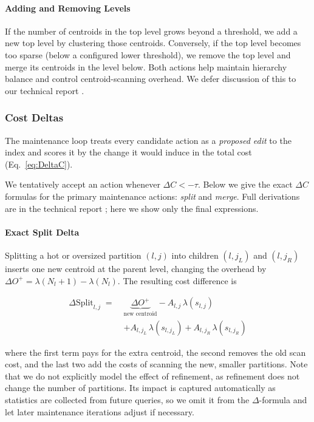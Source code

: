 \paragraph{Adding and Removing Levels} If the number of centroids in the top level grows beyond a threshold, we add a new top level by clustering those centroids. Conversely, if the top level becomes too sparse (below a configured lower threshold), we remove the top level and merge its centroids in the level below. Both actions help maintain hierarchy balance and control centroid-scanning overhead. We defer discussion of this to our technical report \cite{mohoney2025quakeadaptiveindexingvector}.

\subsubsection{Cost Deltas}
\label{sec:maintenance_actions:deltas}

The maintenance loop treats every candidate action as a \emph{proposed
edit} to the index and scores it by the change it would induce in the
total cost (Eq.~\eqref{eq:DeltaC}).

We tentatively accept an action whenever $\Delta C < -\tau$.  Below we give the exact
$\Delta C$ formulas for the primary maintenance actions:
\emph{split} and \emph{merge}.  Full derivations are in the
technical report \cite{mohoney2025quakeadaptiveindexingvector}; here we show only the final expressions.

\paragraph{Exact Split Delta}
Splitting a hot or oversized partition $(l,j)$ into children
$(l,j_L)$ and $(l,j_R)$ inserts one new centroid at the parent level,
changing the overhead by
$\Delta O^{+} = \lambda(N_{l}+1) - \lambda(N_{l})$.  The resulting
cost difference is

\begin{equation}
\begin{aligned}
\Delta\text{Split}_{l,j} \;=\;
  &\underbrace{\Delta O^{+}}_{\text{new centroid}}
  - A_{l,j}\,\lambda(s_{l,j})  \\
  &+ A_{l,j_L}\,\lambda(s_{l,j_L})
  + A_{l,j_R}\,\lambda(s_{l,j_R})
\end{aligned}
\label{eq:delta_split_exact}
\end{equation}

where the first term pays for the extra centroid, the second removes
the old scan cost, and the last two add the costs of scanning the new,
smaller partitions. Note that we do not explicitly model the effect of refinement, as refinement does not change the number of partitions. Its impact is captured automatically as statistics are collected from future queries, so we omit it from the $\Delta$-formula and let later maintenance iterations adjust if necessary.

